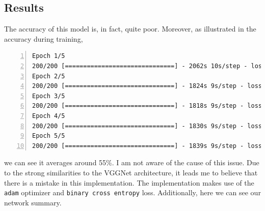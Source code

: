 \documentclass[ 12pt ]{article}
\begin{document}
\subsection*{Results}

The accuracy of this model is, in fact, quite poor. Moreover, as illustrated in the accuracy during training,
\begin{lstlisting}[basicstyle=\ttfamily\footnotesize, numbers=left, tabsize=4, frame=single, breaklines=true, postbreak=\mbox{\textcolor{red}{$\hookrightarrow$}\space}]
Epoch 1/5
200/200 [==============================] - 2062s 10s/step - loss: 147.0502 - accuracy: 0.5136 - val_loss: 0.7071 - val_accuracy: 0.5067
Epoch 2/5
200/200 [==============================] - 1824s 9s/step - loss: 0.6825 - accuracy: 0.5661
Epoch 3/5
200/200 [==============================] - 1818s 9s/step - loss: 0.6846 - accuracy: 0.5614
Epoch 4/5
200/200 [==============================] - 1830s 9s/step - loss: 0.6756 - accuracy: 0.5874
Epoch 5/5
200/200 [==============================] - 1839s 9s/step - loss: 0.6652 - accuracy: 0.5982
\end{lstlisting}
we can see it averages around 55\%. I am not aware of the cause of this issue. Due to the strong similarities to the VGGNet architecture, it leads me to believe that there is a mistake
in this implementation. The implementation makes use of the \verb|adam| optimizer and \verb|binary cross entropy| loss. Additionally, here we can see our network summary.
\end{document}

